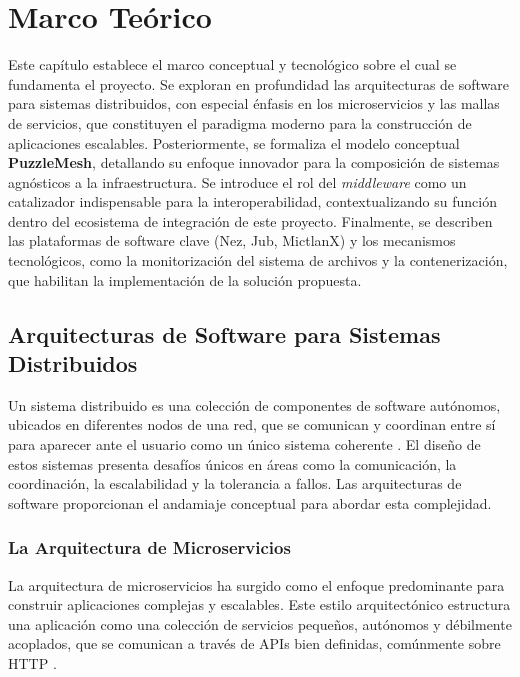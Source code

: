 \section{Marco Teórico}
Este capítulo establece el marco conceptual y tecnológico sobre el cual se fundamenta el proyecto. Se exploran en profundidad las arquitecturas de software para sistemas distribuidos, con especial énfasis en los microservicios y las mallas de servicios, que constituyen el paradigma moderno para la construcción de aplicaciones escalables. Posteriormente, se formaliza el modelo conceptual \textbf{PuzzleMesh}, detallando su enfoque innovador para la composición de sistemas agnósticos a la infraestructura. Se introduce el rol del \textit{middleware} como un catalizador indispensable para la interoperabilidad, contextualizando su función dentro del ecosistema de integración de este proyecto. Finalmente, se describen las plataformas de software clave (Nez, Jub, MictlanX) y los mecanismos tecnológicos, como la monitorización del sistema de archivos y la contenerización, que habilitan la implementación de la solución propuesta.

\subsection{Arquitecturas de Software para Sistemas Distribuidos}
Un sistema distribuido es una colección de componentes de software autónomos, ubicados en diferentes nodos de una red, que se comunican y coordinan entre sí para aparecer ante el usuario como un único sistema coherente \cite{tanenbaum2014distributed}. El diseño de estos sistemas presenta desafíos únicos en áreas como la comunicación, la coordinación, la escalabilidad y la tolerancia a fallos. Las arquitecturas de software proporcionan el andamiaje conceptual para abordar esta complejidad.

\subsubsection{La Arquitectura de Microservicios}
La arquitectura de microservicios ha surgido como el enfoque predominante para construir aplicaciones complejas y escalables. Este estilo arquitectónico estructura una aplicación como una colección de servicios pequeños, autónomos y débilmente acoplados, que se comunican a través de APIs bien definidas, comúnmente sobre HTTP \cite{newman2021building}.

